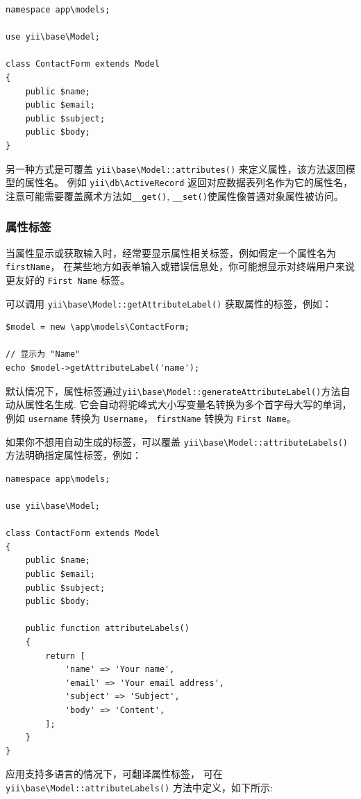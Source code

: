 \lstset{language=php}\begin{lstlisting}
namespace app\models;

use yii\base\Model;

class ContactForm extends Model
{
    public $name;
    public $email;
    public $subject;
    public $body;
}
\end{lstlisting}
另一种方式是可覆盖 \texttt{yii{\allowbreak{}\textbackslash}base{\allowbreak{}\textbackslash}Model\allowbreak{}::\allowbreak{}attributes()} 来定义属性，该方法返回模型的属性名。
例如 \texttt{yii{\allowbreak{}\textbackslash}db{\allowbreak{}\textbackslash}ActiveRecord} 返回对应数据表列名作为它的属性名，
注意可能需要覆盖魔术方法如\lstinline|__get()|, \lstinline|__set()|使属性像普通对象属性被访问。

\subsubsection{属性标签 \label{structure-models.md::attribute-labels}}
当属性显示或获取输入时，经常要显示属性相关标签，例如假定一个属性名为\lstinline|firstName|，
在某些地方如表单输入或错误信息处，你可能想显示对终端用户来说更友好的 \lstinline|First Name| 标签。

可以调用 \texttt{yii{\allowbreak{}\textbackslash}base{\allowbreak{}\textbackslash}Model\allowbreak{}::\allowbreak{}getAttributeLabel()} 获取属性的标签，例如：

\lstset{language=php}\begin{lstlisting}
$model = new \app\models\ContactForm;

// 显示为 "Name"
echo $model->getAttributeLabel('name');
\end{lstlisting}
默认情况下，属性标签通过\texttt{yii{\allowbreak{}\textbackslash}base{\allowbreak{}\textbackslash}Model\allowbreak{}::\allowbreak{}generateAttributeLabel()}方法自动从属性名生成. 
它会自动将驼峰式大小写变量名转换为多个首字母大写的单词，例如 \lstinline|username| 转换为 \lstinline|Username|，
\lstinline|firstName| 转换为 \lstinline|First Name|。

如果你不想用自动生成的标签，可以覆盖 \texttt{yii{\allowbreak{}\textbackslash}base{\allowbreak{}\textbackslash}Model\allowbreak{}::\allowbreak{}attributeLabels()} 方法明确指定属性标签，例如：

\lstset{language=php}\begin{lstlisting}
namespace app\models;

use yii\base\Model;

class ContactForm extends Model
{
    public $name;
    public $email;
    public $subject;
    public $body;

    public function attributeLabels()
    {
        return [
            'name' => 'Your name',
            'email' => 'Your email address',
            'subject' => 'Subject',
            'body' => 'Content',
        ];
    }
}
\end{lstlisting}
应用支持多语言的情况下，可翻译属性标签，
可在 \texttt{yii{\allowbreak{}\textbackslash}base{\allowbreak{}\textbackslash}Model\allowbreak{}::\allowbreak{}attributeLabels()} 方法中定义，如下所示:

